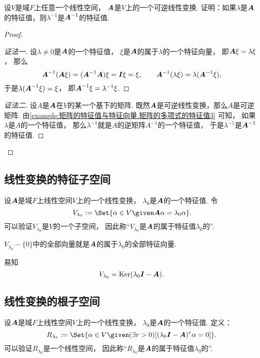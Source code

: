 \begin{example}
设\(V\)是域\(F\)上任意一个线性空间，
\(\boldsymbol{A}\)是\(V\)上的一个可逆线性变换.
证明：如果\(\lambda\)是\(\boldsymbol{A}\)的特征值，则\(\lambda^{-1}\)是\(\boldsymbol{A}^{-1}\)的特征值.
\begin{proof}
\begin{proof}[证法一]
设\(\lambda\neq0\)是\(\boldsymbol{A}\)的一个特征值，
\(\xi\)是\(\boldsymbol{A}\)的属于\(\lambda\)的一个特征向量，
即\(\boldsymbol{A}\xi=\lambda\xi\)，
那么\[
	\boldsymbol{A}^{-1}(\boldsymbol{A}\xi)
	= (\boldsymbol{A}^{-1}\boldsymbol{A})\xi
	= \boldsymbol{I}\xi
	= \xi,
	\qquad
	\boldsymbol{A}^{-1}(\lambda\xi)
	= \lambda(\boldsymbol{A}^{-1}\xi),
\]
于是\(\lambda(\boldsymbol{A}^{-1}\xi)=\xi\)，
即\(\boldsymbol{A}^{-1}\xi=\lambda^{-1}\xi\).
\end{proof}
\begin{proof}[证法二]
设\(A\)是\(\boldsymbol{A}\)在\(V\)的某一个基下的矩阵.
既然\(\boldsymbol{A}\)是可逆线性变换，那么\(A\)是可逆矩阵.
由\cref{example:矩阵的特征值与特征向量.矩阵的多项式的特征值3} 可知，
如果\(\lambda\)是\(A\)的一个特征值，
那么\(\lambda^{-1}\)就是\(A\)的逆矩阵\(A^{-1}\)的一个特征值，
于是\(\lambda^{-1}\)是\(\boldsymbol{A}^{-1}\)的特征值.
\end{proof}\let\qed\relax
\end{proof}
\end{example}

\subsection{线性变换的特征子空间}
设\(\boldsymbol{A}\)是域\(F\)上线性空间\(V\)上的一个线性变换，
\(\lambda_0\)是\(\boldsymbol{A}\)的一个特征值.
令\begin{equation}\label{equation:线性变换的特征值和特征向量.特征子空间}
	V_{\lambda_0}
	\defeq
	\Set{ \alpha \in V \given \vb{A}\alpha=\lambda_0\alpha }.
\end{equation}
可以验证\(V_{\lambda_0}\)是\(V\)的一个子空间，
因此称“\(V_{\lambda_0}\)是\(\boldsymbol{A}\)的属于特征值\(\lambda_0\)的”.

\(V_{\lambda_0}-\{0\}\)中的全部向量就是\(\boldsymbol{A}\)的属于\(\lambda_0\)的全部特征向量.

易知\begin{equation*}
	V_{\lambda_0}
	= \operatorname{Ker}(\lambda_0 \boldsymbol{I} - \boldsymbol{A}).
\end{equation*}

\subsection{线性变换的根子空间}
设\(\boldsymbol{A}\)是域\(F\)上线性空间\(V\)上的一个线性变换，
\(\lambda_0\)是\(\boldsymbol{A}\)的一个特征值.
定义：\begin{equation}
	R_{\lambda_0} \defeq \Set{
		\alpha \in V
		\given
		(\exists r>0)
		[
			(\lambda_0 \vb{I} - \vb{A})^r \alpha = 0
		]
	}.
\end{equation}
可以验证\(R_{\lambda_0}\)是一个线性空间，
因此称“\(R_{\lambda_0}\)是\(\boldsymbol{A}\)的属于特征值\(\lambda_0\)的”.

